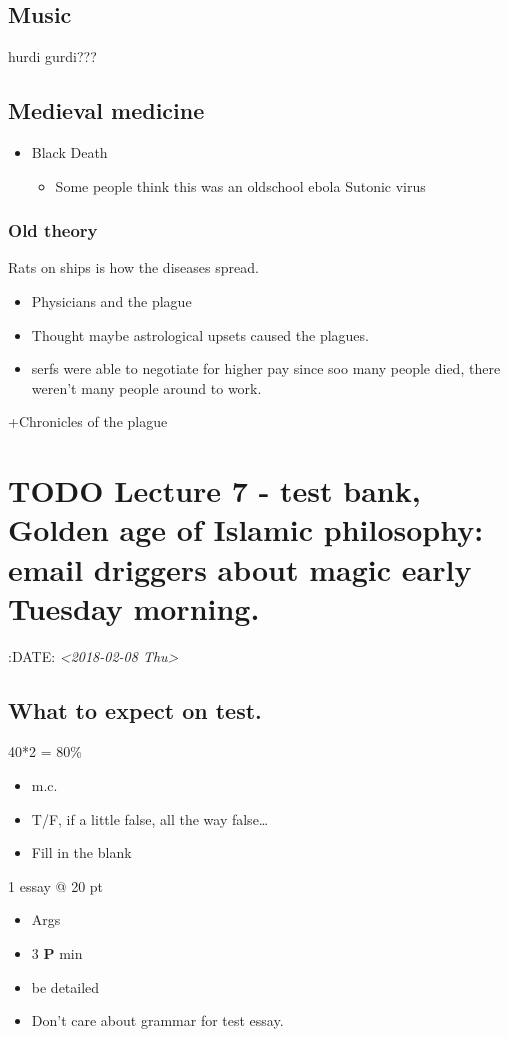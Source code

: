 \documentclass[11pt]{article}
\begin{document}
\subsection{Music}
\label{sec-7-7}
hurdi gurdi???

\subsection{Medieval medicine}
\label{sec-7-8}
\begin{itemize}
\item Black Death
\begin{itemize}
\item Some people think this was an oldschool ebola 
Sutonic virus
\end{itemize}
\end{itemize}
\subsubsection{Old theory}
\label{sec-7-8-1}
Rats on ships is how the diseases spread.
\begin{itemize}
\item Physicians and the plague
\end{itemize}



\begin{itemize}
\item Thought maybe astrological upsets caused the plagues.\\
\item serfs were able to negotiate for higher pay since soo many people died, there weren't many people around to work.\\
\end{itemize}
+Chronicles of the plague

\section{{\bfseries\sffamily TODO} Lecture 7 - test bank, Golden age of Islamic philosophy: email driggers about magic early Tuesday morning.}
\label{sec-8}
:DATE: \textit{<2018-02-08 Thu>}

\subsection{What to expect on test.}
\label{sec-8-1}
40*2 = 80\%
\begin{itemize}
\item m.c.
\item T/F, if a little false, all the way false\ldots{}
\item Fill in the blank
\end{itemize}
1 essay @ 20 pt
\begin{itemize}
\item Args
\item 3 \textbf{P} min
\item be detailed
\item Don't care about grammar for test essay.
\end{itemize}
\end{document}
